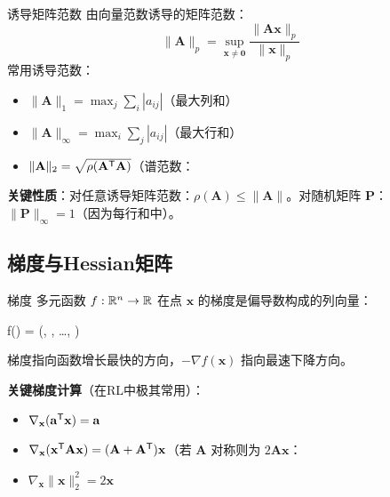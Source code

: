 \begin{mydefinition}{诱导矩阵范数}
由向量范数诱导的矩阵范数：
\[
\|\mathbf{A}\|_p = \sup_{\mathbf{x} \neq \mathbf{0}} \frac{\|\mathbf{A}\mathbf{x}\|_p}{\|\mathbf{x}\|_p}
\]
常用诱导范数：
\begin{itemize}
    \item $\|\mathbf{A}\|_1 = \max_j \sum_i |a_{ij}|$（最大列和）
    \item $\|\mathbf{A}\|_\infty = \max_i \sum_j |a_{ij}|$（最大行和）
    \item $\|\mathbf{A}\|_2 = \sqrt{\rho(\mathbf{A}^{\mathsf{T}} \mathbf{A})}$（谱范数：
\end{itemize}
\end{mydefinition}

\textbf{关键性质}：对任意诱导矩阵范数：$\rho(\mathbf{A}) \le \|\mathbf{A}\|$。对随机矩阵 $\mathbf{P}$：$\|\mathbf{P}\|_\infty = 1$（因为每行和中）。

\subsection{梯度与Hessian矩阵}

\begin{mydefinition}{梯度}
多元函数 $f: \mathbb{R}^n \to \mathbb{R}$ 在点 $\mathbf{x}$ 的梯度是偏导数构成的列向量：
\begin{myformula}
\nabla f() = \left(, , \dots, \right)\T
\end{myformula}
梯度指向函数增长最快的方向，$-\nabla f(\mathbf{x})$ 指向最速下降方向。
\end{mydefinition}

\textbf{关键梯度计算}（在RL中极其常用）：
\begin{itemize}
    \item $\nabla_{\mathbf{x}} (\mathbf{a}^{\mathsf{T}} \mathbf{x}) = \mathbf{a}$
    \item $\nabla_{\mathbf{x}} (\mathbf{x}^{\mathsf{T}} \mathbf{A} \mathbf{x}) = (\mathbf{A} + \mathbf{A}^{\mathsf{T}}) \mathbf{x}$（若 $\mathbf{A}$ 对称则为 $2\mathbf{A}\mathbf{x}$：
    \item $\nabla_{\mathbf{x}} \|\mathbf{x}\|_2^2 = 2\mathbf{x}$
\end{itemize}

